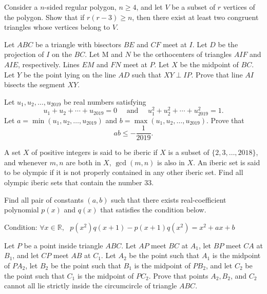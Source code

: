 \documentclass[11pt]{scrartcl}
\begin{document}
\begin{problem}[3173124324482060330]
Consider a $n$-sided regular polygon, $n \geq 4$, and let $V$ be a subset of $r$ vertices of the polygon. Show that if $r(r-3) \geq n$, then there exist at least two congruent triangles whose vertices belong to $V$.
\end{problem}
\begin{problem}[3175174607535531817]
Let $ABC$ be a triangle with bisectors $BE$ and $CF$ meet at $I$. Let $D$ be the projection of $I$ on the $BC$. Let M and $N$ be the orthocenters of triangles $AIF$ and $AIE$, respectively. Lines $EM$ and $FN$ meet at $P.$ Let $X$ be the midpoint of $BC$. Let $Y$ be the point lying on the line $AD$ such that $XY \perp IP$. Prove that line $AI$ bisects the segment $XY$.
\end{problem}
\begin{problem}[3192129869376364982]
Let $u_1, u_2, \dots, u_{2019}$ be real numbers satisfying\[u_{1}+u_{2}+\cdots+u_{2019}=0 \quad \text { and } \quad u_{1}^{2}+u_{2}^{2}+\cdots+u_{2019}^{2}=1.\]Let $a=\min \left(u_{1}, u_{2}, \ldots, u_{2019}\right)$ and $b=\max \left(u_{1}, u_{2}, \ldots, u_{2019}\right)$. Prove that
\[
a b \leqslant-\frac{1}{2019}.
\]
\end{problem}
\begin{problem}[3214097809181137769]
	A set $X$ of positive integers is said to be iberic if $X$ is a subset of $\{2, 3, \dots, 2018\}$, and whenever $m, n$ are both in $X$, $\gcd(m, n)$ is also in $X$. An iberic set is said to be olympic if it is not properly contained in any other iberic set. Find all olympic iberic sets that contain the number $33$.
\end{problem}
\begin{problem}[3232480961068145020]
Find all pair of constants $(a,b)$ such that there exists real-coefficient polynomial $p(x)$ and $q(x)$ that satisfies the condition below.

Condition: $\forall x\in \mathbb R,$ $ $ $p(x^2)q(x+1)-p(x+1)q(x^2)=x^2+ax+b$
\end{problem}
\begin{problem}[3245291910836201005]
	Let $P$ be a point inside triangle $ABC$. Let $AP$ meet $BC$ at $A_1$, let $BP$ meet $CA$ at $B_1$, and let $CP$ meet $AB$ at $C_1$. Let $A_2$ be the point such that $A_1$ is the midpoint of $PA_2$, let $B_2$ be the point such that $B_1$ is the midpoint of $PB_2$, and let $C_2$ be the point such that $C_1$ is the midpoint of $PC_2$. Prove that points $A_2, B_2$, and $C_2$ cannot all lie strictly inside the circumcircle of triangle $ABC$.
\end{problem}
\end{document}

